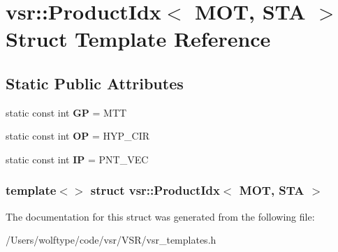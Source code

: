 \hypertarget{structvsr_1_1_product_idx_3_01_m_o_t_00_01_s_t_a_01_4}{\section{vsr\-:\-:Product\-Idx$<$ M\-O\-T, S\-T\-A $>$ Struct Template Reference}
\label{structvsr_1_1_product_idx_3_01_m_o_t_00_01_s_t_a_01_4}
}
\subsection*{Static Public Attributes}
\begin{DoxyCompactItemize}
\item 
\hypertarget{structvsr_1_1_product_idx_3_01_m_o_t_00_01_s_t_a_01_4_a8dae62d6f263a340ced5bd3c05f03daf}{static const int {\bfseries G\-P} = M\-T\-T}\label{structvsr_1_1_product_idx_3_01_m_o_t_00_01_s_t_a_01_4_a8dae62d6f263a340ced5bd3c05f03daf}

\item 
\hypertarget{structvsr_1_1_product_idx_3_01_m_o_t_00_01_s_t_a_01_4_acd597316aa1aaa1d41ea81808e12e8a6}{static const int {\bfseries O\-P} = H\-Y\-P\-\_\-\-C\-I\-R}\label{structvsr_1_1_product_idx_3_01_m_o_t_00_01_s_t_a_01_4_acd597316aa1aaa1d41ea81808e12e8a6}

\item 
\hypertarget{structvsr_1_1_product_idx_3_01_m_o_t_00_01_s_t_a_01_4_ac892b783b211a49662c15f5ea89c39df}{static const int {\bfseries I\-P} = P\-N\-T\-\_\-\-V\-E\-C}\label{structvsr_1_1_product_idx_3_01_m_o_t_00_01_s_t_a_01_4_ac892b783b211a49662c15f5ea89c39df}

\end{DoxyCompactItemize}
\subsubsection*{template$<$$>$ struct vsr\-::\-Product\-Idx$<$ M\-O\-T, S\-T\-A $>$}



The documentation for this struct was generated from the following file\-:\begin{DoxyCompactItemize}
\item 
/\-Users/wolftype/code/vsr/\-V\-S\-R/vsr\-\_\-templates.\-h\end{DoxyCompactItemize}
